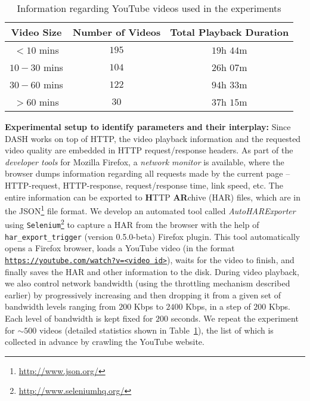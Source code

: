 \begin{table}[!t]
 \small
 \centering
 \caption{\small{Information regarding YouTube videos used in the experiments}}
 \label{table:chap03s1:statvid}
 \begin{tabular}{|c|c|c|}
  \hline 
  \textbf{Video Size} & \textbf{Number of Videos} & \textbf{Total Playback Duration} \\
  \hline \hline 
  $<10$ mins & $195$ & $19$h $44$m \\
  \hline 
  $10-30$ mins & $104$ & $26$h $07$m \\
  \hline 
  $30-60$ mins & $122$ & $94$h $33$m \\
  \hline 
  $>60$ mins & $30$ & $37$h $15$m \\
  \hline 
 \end{tabular}
\end{table}
{\bf Experimental setup to identify parameters and their interplay:} Since DASH works on top of HTTP, the video playback information and the requested video quality are embedded in HTTP request/response headers.
As part of the {\em developer tools} for Mozilla Firefox, a {\em network monitor} is available, where the browser dumps information regarding all requests made by the current page -- HTTP-request, HTTP-response, request/response time, link speed, etc.
The entire information can be exported to {\bf H}TTP {\bf AR}chive (HAR) files, which are in the JSON\footnote{\url{http://www.json.org/}} file format.
We develop an automated tool called {\em AutoHARExporter} using \texttt{Selenium}\footnote{\url{http://www.seleniumhq.org/}} to capture a HAR from the browser with the help of \texttt{har\_export\_trigger} (version 0.5.0-beta) Firefox plugin.
This tool automatically opens a Firefox browser, loads a YouTube video (in the format {\tt \url{https://youtube.com/watch?v=<video id>}}), waits for the video to finish, and finally saves the HAR and other information to the disk.
During video playback, we also control network bandwidth (using the throttling mechanism described earlier) by progressively increasing and then dropping it from a given set of bandwidth levels ranging from $200$ Kbps to $2400$ Kbps, in a step of $200$ Kbps.
Each level of bandwidth is kept fixed for $200$ seconds. 
We repeat the experiment for $\sim500$ videos (detailed statistics shown in Table~\ref{table:chap03s1:statvid}), the list of which is collected in advance by crawling the YouTube website.

